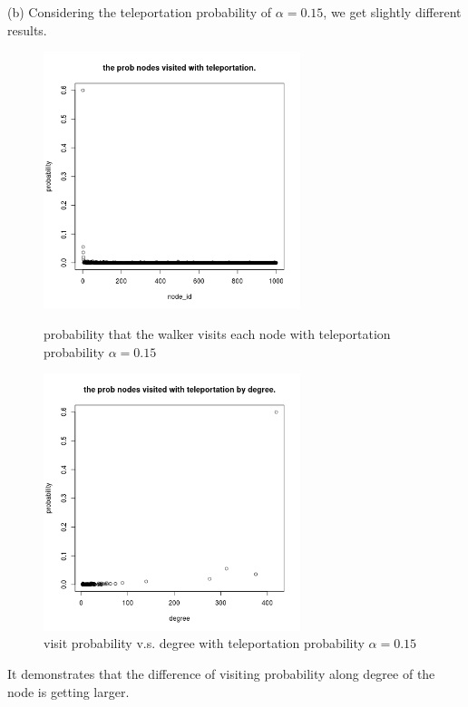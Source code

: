 \documentclass[draftcls,12pt,onecolumn]{IEEEtran}
\begin{document}
(b) Considering the teleportation probability of $\alpha = 0.15$, we get slightly different results. 
\begin{figure}[htbp]
\centering
\begin{minipage}[t]{0.48\textwidth}
\centering
\includegraphics[width=7.5cm]{3_b_rw_prob_teleport.png}
\caption{probability that the walker visits each node with teleportation probability $\alpha = 0.15$}
\label{fig21}
\end{minipage}
\begin{minipage}[t]{0.48\textwidth}
\centering
\includegraphics[width=7.5cm]{3_b_rw_prob_teleport_by_degree.png}
\caption{visit probability v.s. degree with teleportation probability $\alpha = 0.15$}
\label{fig22}
\end{minipage}
\end{figure}
It demonstrates that the difference of visiting probability along degree of the node is getting larger. 
\end{document}
